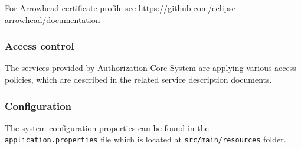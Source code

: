 \documentclass[a4paper]{arrowhead}
\begin{document}
For Arrowhead certificate profile see \url{https://github.com/eclipse-arrowhead/documentation}

\subsubsection {Access control}
The services provided by Authorization Core System are applying various access policies, which are described in the related service description documents.

\subsubsection {Configuration}
   
The system configuration properties can be found in the \texttt{application.properties} file which is located at \texttt{src/main/resources} folder.
\end{document}
